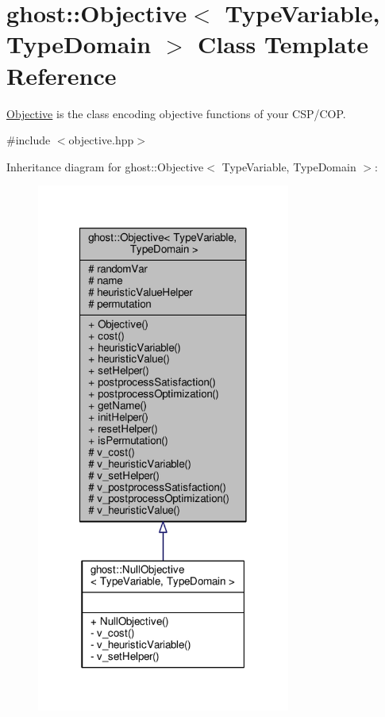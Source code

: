 \hypertarget{classghost_1_1Objective}{\section{ghost\-:\-:Objective$<$ Type\-Variable, Type\-Domain $>$ Class Template Reference}
\label{classghost_1_1Objective}
}


\hyperlink{classghost_1_1Objective}{Objective} is the class encoding objective functions of your C\-S\-P/\-C\-O\-P.  




{\ttfamily \#include $<$objective.\-hpp$>$}



Inheritance diagram for ghost\-:\-:Objective$<$ Type\-Variable, Type\-Domain $>$\-:\nopagebreak
\begin{figure}[H]
\begin{center}
\leavevmode
\includegraphics[width=236pt]{classghost_1_1Objective__inherit__graph}
\end{center}
\end{figure}


